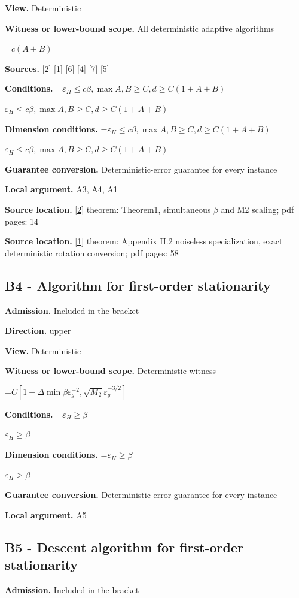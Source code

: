 \documentclass[10pt,a4paper]{article}
\newcommand{\AtlasMath}[1]{\par\begingroup\centering\setbox0=\hbox{$\displaystyle #1$}\ifdim\wd0>1.4\linewidth\typeout{ATLAS WIDE FORMULA: \the\wd0}\fi\ifdim\wd0>\linewidth\resizebox{\linewidth}{!}{\box0}\else\box0\fi\par\endgroup}
\newcommand{\AtlasInlineMath}[1]{\begingroup\setbox0=\hbox{$#1$}\ifdim\wd0>.4\linewidth\endgroup\AtlasMath{#1}\else\endgroup$#1$\fi}
\begin{document}
\textbf{View.} Deterministic

\textbf{Witness or lower-bound scope.} All deterministic adaptive algorithms

\AtlasMath{c(A+B)}
\textbf{Sources.} \href{https://arxiv.org/abs/1710.11606}{[2]} \href{https://proceedings.mlr.press/v125/arjevani20a/arjevani20a.pdf}{[1]} \href{https://proceedings.mlr.press/v125/arjevani20a/arjevani20a.pdf}{[6]} \href{https://arxiv.org/abs/2610.16832}{[4]} \href{https://arxiv.org/abs/1710.11606v3}{[7]} \href{https://optimization-online.org/wp-content/uploads/2015/06/4970.pdf}{[5]}

\textbf{Conditions.} \AtlasInlineMath{\varepsilon_H\le c\beta,\max{A,B}\ge C,d\ge C(1+A+B)}

\textbf{Dimension conditions.} \AtlasInlineMath{\varepsilon_H\le c\beta,\max{A,B}\ge C,d\ge C(1+A+B)}

\textbf{Guarantee conversion.} Deterministic-error guarantee for every instance

\textbf{Local argument.} A3, A4, A1

\textbf{Source location.} \href{https://arxiv.org/abs/1710.11606}{[2]} theorem: Theorem1, simultaneous $\beta$ and M2 scaling; pdf pages: 14

\textbf{Source location.} \href{https://proceedings.mlr.press/v125/arjevani20a/arjevani20a.pdf}{[1]} theorem: Appendix H.2 noiseless specialization, exact deterministic rotation conversion; pdf pages: 58

\subsection{B4 - Algorithm for first-order stationarity}
\textbf{Admission.} Included in the bracket

\textbf{Direction.} upper

\textbf{View.} Deterministic

\textbf{Witness or lower-bound scope.} Deterministic witness

\AtlasMath{C[1+\Delta \min{\beta\varepsilon_g^{-2},\sqrt{M_2}\varepsilon_g^{-3/2}}]}
\textbf{Conditions.} \AtlasInlineMath{\varepsilon_H\ge \beta}

\textbf{Dimension conditions.} \AtlasInlineMath{\varepsilon_H\ge \beta}

\textbf{Guarantee conversion.} Deterministic-error guarantee for every instance

\textbf{Local argument.} A5

\subsection{B5 - Descent algorithm for first-order stationarity}
\textbf{Admission.} Included in the bracket
\end{document}
